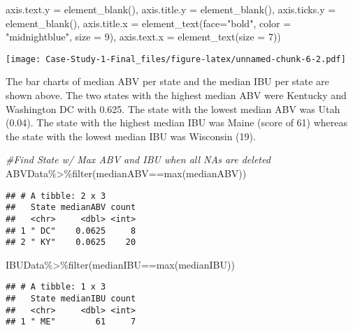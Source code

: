 \documentclass[
]{article}
\newenvironment{Shaded}{\begin{snugshade}}{\end{snugshade}}
\newcommand{\AttributeTok}[1]{\textcolor[rgb]{0.77,0.63,0.00}{#1}}
\newcommand{\CommentTok}[1]{\textcolor[rgb]{0.56,0.35,0.01}{\textit{#1}}}
\newcommand{\DecValTok}[1]{\textcolor[rgb]{0.00,0.00,0.81}{#1}}
\newcommand{\FunctionTok}[1]{\textcolor[rgb]{0.00,0.00,0.00}{#1}}
\newcommand{\NormalTok}[1]{#1}
\newcommand{\SpecialCharTok}[1]{\textcolor[rgb]{0.00,0.00,0.00}{#1}}
\newcommand{\StringTok}[1]{\textcolor[rgb]{0.31,0.60,0.02}{#1}}
\begin{document}
\begin{Shaded}
\begin{Highlighting}[]
        \AttributeTok{axis.text.y =} \FunctionTok{element\_blank}\NormalTok{(),}
        \AttributeTok{axis.title.y =} \FunctionTok{element\_blank}\NormalTok{(),}
        \AttributeTok{axis.ticks.y =} \FunctionTok{element\_blank}\NormalTok{(),}
        \AttributeTok{axis.title.x =} \FunctionTok{element\_text}\NormalTok{(}\AttributeTok{face=}\StringTok{"bold"}\NormalTok{, }\AttributeTok{color =} \StringTok{"midnightblue"}\NormalTok{, }\AttributeTok{size =} \DecValTok{9}\NormalTok{),}
        \AttributeTok{axis.text.x =} \FunctionTok{element\_text}\NormalTok{(}\AttributeTok{size =} \DecValTok{7}\NormalTok{))}
\end{Highlighting}
\end{Shaded}

\texttt{[image: Case-Study-1-Final\_files/figure-latex/unnamed-chunk-6-2.pdf]}

The bar charts of median ABV per state and the median IBU per state are
shown above. The two states with the highest median ABV were Kentucky
and Washington DC with 0.625. The state with the lowest median ABV was
Utah (0.04). The state with the highest median IBU was Maine (score of
61) whereas the state with the lowest median IBU was Wisconsin (19).

\begin{Shaded}
\begin{Highlighting}[]
\CommentTok{\#Find State w/ Max ABV and IBU when all NAs are deleted}
\NormalTok{ABVData}\SpecialCharTok{\%\textgreater{}\%}\FunctionTok{filter}\NormalTok{(medianABV}\SpecialCharTok{==}\FunctionTok{max}\NormalTok{(medianABV))}
\end{Highlighting}
\end{Shaded}

\begin{verbatim}
## # A tibble: 2 x 3
##   State medianABV count
##   <chr>     <dbl> <int>
## 1 " DC"    0.0625     8
## 2 " KY"    0.0625    20
\end{verbatim}

\begin{Shaded}
\begin{Highlighting}[]
\NormalTok{IBUData}\SpecialCharTok{\%\textgreater{}\%}\FunctionTok{filter}\NormalTok{(medianIBU}\SpecialCharTok{==}\FunctionTok{max}\NormalTok{(medianIBU))}
\end{Highlighting}
\end{Shaded}

\begin{verbatim}
## # A tibble: 1 x 3
##   State medianIBU count
##   <chr>     <dbl> <int>
## 1 " ME"        61     7
\end{verbatim}
\end{document}
